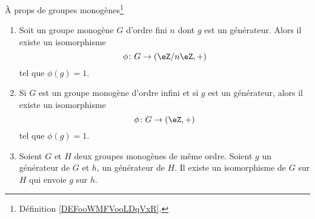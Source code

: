 \begin{lemma}   \label{LemZhxMit}

    À props de groupes monogènes\footnote{Définition \ref{DEFooWMFVooLDqVxR}.}

    \begin{enumerate}
        \item
            

    Soit un groupe monogène \( G\) d'ordre fini \( n\) dont \( g\) est un générateur. Alors il existe un isomorphisme 
    \begin{equation}
        \phi\colon G\to (\eZ/n\eZ,+)
    \end{equation}
    tel que \( \phi(g)=1\).

\item

    Si \( G\) est un groupe monogène d'ordre infini et si \( g\) est un générateur, alors il existe un isomorphisme
    \begin{equation}
        \phi\colon G\to (\eZ,+)
    \end{equation}
    tel que \( \phi(g)=1\).

   \item

    Soient \( G\) et \( H\) deux groupes monogènes de même ordre. Soient \( g\) un générateur de \( G\) et \( h\), un générateur de \( H\). Il existe un isomorphisme de \( G\) sur \( H\) qui envoie \( g\) sur \( h\).
    \end{enumerate}
\end{lemma}

